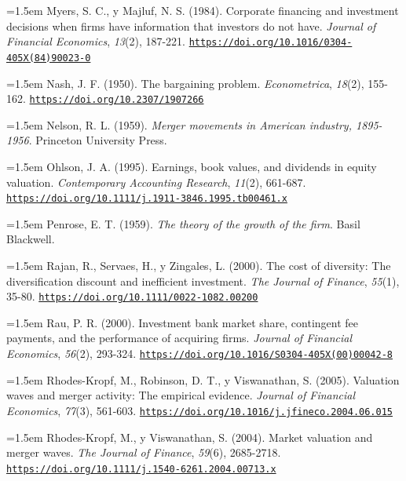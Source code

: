 \documentclass[10pt,a4paper]{article}
\begin{document}
\noindent\hangindent=1.5em Myers, S. C., y Majluf, N. S. (1984). Corporate financing and investment decisions when firms have information that investors do not have. \textit{Journal of Financial Economics}, \textit{13}(2), 187-221. \href{https://doi.org/10.1016/0304-405X(84)90023-0}{\nolinkurl{https://doi.org/10.1016/0304-405X(84)90023-0}}

\noindent\hangindent=1.5em Nash, J. F. (1950). The bargaining problem. \textit{Econometrica}, \textit{18}(2), 155-162. \href{https://doi.org/10.2307/1907266}{\nolinkurl{https://doi.org/10.2307/1907266}}

\noindent\hangindent=1.5em Nelson, R. L. (1959). \textit{Merger movements in American industry, 1895-1956}. Princeton University Press.

\noindent\hangindent=1.5em Ohlson, J. A. (1995). Earnings, book values, and dividends in equity valuation. \textit{Contemporary Accounting Research}, \textit{11}(2), 661-687. \href{https://doi.org/10.1111/j.1911-3846.1995.tb00461.x}{\nolinkurl{https://doi.org/10.1111/j.1911-3846.1995.tb00461.x}}

\noindent\hangindent=1.5em Penrose, E. T. (1959). \textit{The theory of the growth of the firm}. Basil Blackwell.

\noindent\hangindent=1.5em Rajan, R., Servaes, H., y Zingales, L. (2000). The cost of diversity: The diversification discount and inefficient investment. \textit{The Journal of Finance}, \textit{55}(1), 35-80. \href{https://doi.org/10.1111/0022-1082.00200}{\nolinkurl{https://doi.org/10.1111/0022-1082.00200}}

\noindent\hangindent=1.5em Rau, P. R. (2000). Investment bank market share, contingent fee payments, and the performance of acquiring firms. \textit{Journal of Financial Economics}, \textit{56}(2), 293-324. \href{https://doi.org/10.1016/S0304-405X(00)00042-8}{\nolinkurl{https://doi.org/10.1016/S0304-405X(00)00042-8}}

\noindent\hangindent=1.5em Rhodes-Kropf, M., Robinson, D. T., y Viswanathan, S. (2005). Valuation waves and merger activity: The empirical evidence. \textit{Journal of Financial Economics}, \textit{77}(3), 561-603. \href{https://doi.org/10.1016/j.jfineco.2004.06.015}{\nolinkurl{https://doi.org/10.1016/j.jfineco.2004.06.015}}

\noindent\hangindent=1.5em Rhodes-Kropf, M., y Viswanathan, S. (2004). Market valuation and merger waves. \textit{The Journal of Finance}, \textit{59}(6), 2685-2718. \href{https://doi.org/10.1111/j.1540-6261.2004.00713.x}{\nolinkurl{https://doi.org/10.1111/j.1540-6261.2004.00713.x}}
\end{document}
